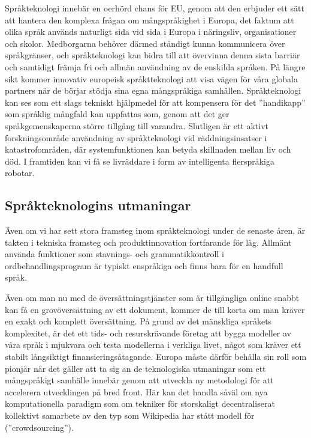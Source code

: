 \begin{multicols}{2}
Språkteknologi innebär en oerhörd chans för EU, genom att den erbjuder
ett sätt att hantera den komplexa frågan om mångspråkighet i Europa,
det faktum att olika språk används naturligt sida vid sida i Europa i
näringsliv, organisationer och skolor. Medborgarna behöver därmed
ständigt kunna kommunicera över språkgränser, och språkteknologi kan
bidra till att övervinna denna sista barriär och samtidigt främja fri
och allmän användning av de enskilda språken. På längre sikt kommer
innovativ europeisk språktteknologi att visa vägen för våra globala
partners när de börjar stödja sina egna mångspråkiga
samhällen. Språkteknologi kan ses som ett slags tekniskt hjälpmedel
för att kompensera för det ''handikapp'' som språklig mångfald kan
uppfattas som, genom att det ger språkgemenskaperna större tillgång
till varandra. Slutligen är ett aktivt forskningsområde användning av
språkteknologi vid räddningsinsatser i katastrofområden, där
systemfunktionen kan betyda skillnaden mellan liv och död. I framtiden
kan vi få se livräddare i form av intelligenta flerspråkiga robotar.


\subsection{Språkteknologins utmaningar}

Även om vi har sett stora framsteg inom språkteknologi under de
senaste åren, är takten i tekniska framsteg och produktinnovation
fortfarande för låg. Allmänt använda funktioner som stavnings- och
grammatikkontroll i ordbehandlingsprogram är typiskt enspråkiga och
finns bara för en handfull språk.


Även om man nu med de översättningstjänster som är tillgängliga online
snabbt kan få en grovöversättning av ett dokument, kommer de till
korta om man kräver en exakt och komplett översättning. På grund av
det mänskliga språkets komplexitet, är det ett tids- och
resurskrävande företag att bygga modeller av våra språk i mjukvara och
testa modellerna i verkliga livet, något som kräver ett stabilt
långsiktigt finansierings\-åtagande. Europa måste därför behålla sin
roll som pionjär när det gäller att ta sig an de teknologiska
utmaningar som ett mångspråkigt samhälle innebär genom att utveckla ny
metodologi för att accelerera utvecklingen på bred front. Här kan det
handla såväl om nya komputationella paradigm som om tekniker för
storskaligt decentraliserat kollektivt samarbete av den typ som
Wikipedia har stått modell för (''crowdsourcing'').



\end{multicols}
